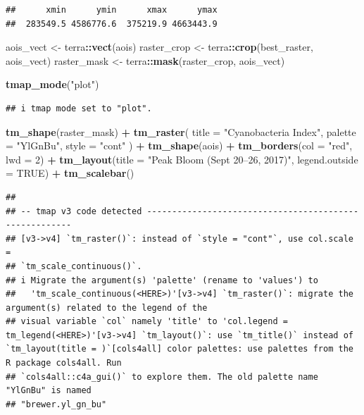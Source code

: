 \documentclass[
]{article}
\newenvironment{Shaded}{\begin{snugshade}}{\end{snugshade}}
\newcommand{\AttributeTok}[1]{\textcolor[rgb]{0.13,0.29,0.53}{#1}}
\newcommand{\ConstantTok}[1]{\textcolor[rgb]{0.56,0.35,0.01}{#1}}
\newcommand{\DecValTok}[1]{\textcolor[rgb]{0.00,0.00,0.81}{#1}}
\newcommand{\FunctionTok}[1]{\textcolor[rgb]{0.13,0.29,0.53}{\textbf{#1}}}
\newcommand{\NormalTok}[1]{#1}
\newcommand{\OtherTok}[1]{\textcolor[rgb]{0.56,0.35,0.01}{#1}}
\newcommand{\SpecialCharTok}[1]{\textcolor[rgb]{0.81,0.36,0.00}{\textbf{#1}}}
\newcommand{\StringTok}[1]{\textcolor[rgb]{0.31,0.60,0.02}{#1}}
\begin{document}
\begin{verbatim}
##      xmin      ymin      xmax      ymax 
##  283549.5 4586776.6  375219.9 4663443.9
\end{verbatim}

\begin{Shaded}
\begin{Highlighting}[]
\NormalTok{aois\_vect }\OtherTok{\textless{}{-}}\NormalTok{ terra}\SpecialCharTok{::}\FunctionTok{vect}\NormalTok{(aois)}
\NormalTok{raster\_crop }\OtherTok{\textless{}{-}}\NormalTok{ terra}\SpecialCharTok{::}\FunctionTok{crop}\NormalTok{(best\_raster, aois\_vect)}
\NormalTok{raster\_mask }\OtherTok{\textless{}{-}}\NormalTok{ terra}\SpecialCharTok{::}\FunctionTok{mask}\NormalTok{(raster\_crop, aois\_vect)}

\FunctionTok{tmap\_mode}\NormalTok{(}\StringTok{"plot"}\NormalTok{)}
\end{Highlighting}
\end{Shaded}

\begin{verbatim}
## i tmap mode set to "plot".
\end{verbatim}

\begin{Shaded}
\begin{Highlighting}[]
\FunctionTok{tm\_shape}\NormalTok{(raster\_mask) }\SpecialCharTok{+}
  \FunctionTok{tm\_raster}\NormalTok{(}
    \AttributeTok{title =} \StringTok{"Cyanobacteria Index"}\NormalTok{,}
    \AttributeTok{palette =} \StringTok{"YlGnBu"}\NormalTok{,}
    \AttributeTok{style =} \StringTok{"cont"}
\NormalTok{  ) }\SpecialCharTok{+}
  \FunctionTok{tm\_shape}\NormalTok{(aois) }\SpecialCharTok{+}
  \FunctionTok{tm\_borders}\NormalTok{(}\AttributeTok{col =} \StringTok{"red"}\NormalTok{, }\AttributeTok{lwd =} \DecValTok{2}\NormalTok{) }\SpecialCharTok{+}
  \FunctionTok{tm\_layout}\NormalTok{(}\AttributeTok{title =} \StringTok{"Peak Bloom (Sept 20–26, 2017)"}\NormalTok{, }\AttributeTok{legend.outside =} \ConstantTok{TRUE}\NormalTok{) }\SpecialCharTok{+}
  \FunctionTok{tm\_scalebar}\NormalTok{()}
\end{Highlighting}
\end{Shaded}

\begin{verbatim}
## 
## -- tmap v3 code detected -------------------------------------------------------
## [v3->v4] `tm_raster()`: instead of `style = "cont"`, use col.scale =
## `tm_scale_continuous()`.
## i Migrate the argument(s) 'palette' (rename to 'values') to
##   'tm_scale_continuous(<HERE>)'[v3->v4] `tm_raster()`: migrate the argument(s) related to the legend of the
## visual variable `col` namely 'title' to 'col.legend = tm_legend(<HERE>)'[v3->v4] `tm_layout()`: use `tm_title()` instead of `tm_layout(title = )`[cols4all] color palettes: use palettes from the R package cols4all. Run
## `cols4all::c4a_gui()` to explore them. The old palette name "YlGnBu" is named
## "brewer.yl_gn_bu"
\end{verbatim}
\end{document}
